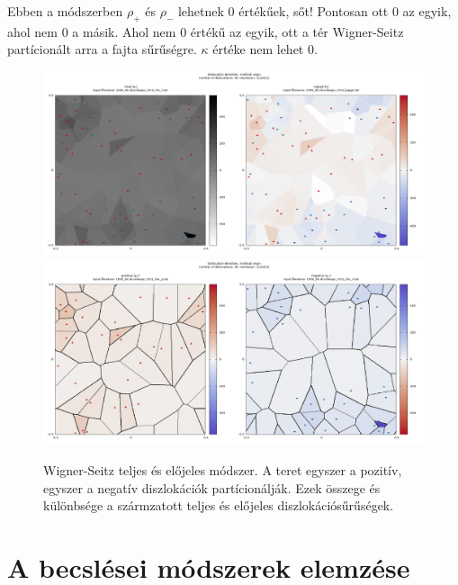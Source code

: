 \documentclass[10pt,a4paper]{scrartcl}
\begin{document}
Ebben a módszerben $\rho_+$ és $\rho_-$ lehetnek 0 értékűek, sőt! Pontosan ott 0 az egyik, ahol nem 0 a másik. Ahol nem 0 értékű az egyik, ott a tér Wigner-Seitz partícionált arra a fajta sűrűségre. $\kappa$ értéke nem lehet 0.

\begin{center}
\begin{figure}
\includegraphics[width=\textwidth]{"../xpattern/example_with_64_dislocations/1000_64.dconfwspn_r512_ts.txt"}
\includegraphics[width=\textwidth]{"../xpattern/example_with_64_dislocations/1000_64.dconfwspn_r512_pn.txt"}
\caption{Wigner-Seitz teljes és előjeles módszer. A teret egyszer a pozitív, egyszer a negatív diszlokációk partícionálják. Ezek összege és különbsége a szármzatott teljes és előjeles diszlokációsűrűségek.}
\end{figure}
\end{center}

\section{A becslései módszerek elemzése}
\end{document}
